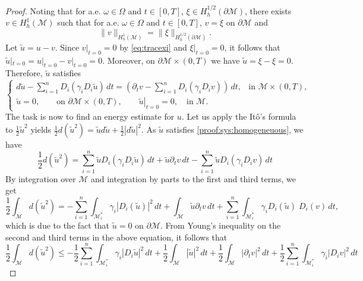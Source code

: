 \documentclass[11pt,oneside,leqno]{amsart}
\numberwithin{equation}{section}
\numberwithin{equation}{section}
\begin{document}
\begin{proof}
Noting that for a.e. $\omega \in \Omega$ and $t \in [0,T]$, $\xi \in H_h^{1/2}(\partial \mathcal{M})$, there exists $v \in H_h^1(\mathcal{M})$ such that for a.e. $\omega \in \Omega$ and $t \in [0,T]$, $v = \xi$ on $\partial \mathcal{M}$ and
\begin{equation}\label{eq:tracexi}
\|v\|_{H_h^1(\mathcal{M})} =  \|\xi\|_{H_h^{1/2}(\partial \mathcal{M})}.
\end{equation}
Let $\tilde{u} = u - v$. Since $v|_{t=0}=0$ by \eqref{eq:tracexi} and $\xi|_{t=0}=0$, it follows that $\tilde{u}|_{t=0} = u|_{t=0} - v|_{t=0} = 0$. Moreover, on $\partial\mathcal{M}\times(0,T)$ we have $\tilde{u} = \xi - \xi = 0$. Therefore, $\tilde{u}$ satisfies
\begin{equation}\label{proof:sys:homogeneuous}
    \begin{cases}
    d\tilde{u} - \sum_{i=1}^{n} D_i(\gamma_i D_i \tilde{u}) \, dt = \left(\partial_t v - \sum_{i=1}^{n} D_i(\gamma_i D_i v)\right) \, dt, & \text{in } \mathcal{M} \times (0,T), \\
    \tilde{u} = 0, \quad\quad\text{on } \partial \mathcal{M} \times (0,T),\quad\quad
    \left.\tilde{u}\right|_{t=0} = 0,\quad \text{in } \mathcal{M}.
    \end{cases}
\end{equation}
The task is now to find an energy estimate for $u$. Let us apply the It\^{o}'s formula to $\displaystyle \frac{1}{2}\tilde{u}^2$ yields $\displaystyle \frac{1}{2}d(\tilde{u}^2)=\tilde{u}d\tilde{u}+\frac{1}{2}|d\tilde{u}|^2$. As $\tilde{u}$ satisfies \eqref{proof:sys:homogeneuous}, we have 
\[
\frac{1}{2}d(\tilde{u}^2)=\sum_{i=1}^{n}\tilde{u}D_i(\gamma_iD_i\tilde{u})\,dt+\tilde{u}\partial_{t}v\,dt-\sum_{i=1}^{n}\tilde{u}D_i(\gamma_iD_iv)\,dt
\]
By integration over $\mathcal{M}$ and integration by parts to the first and third terms, we get
\[
\frac{1}{2}\int_{\mathcal{M}}d(\tilde{u}^{2})=-\sum_{i=1}^{n}\int_{\mathcal{M}_i^{\ast}}\gamma_i|D_i(\tilde{u})|^2\,dt+\int_{\mathcal{M}}\tilde{u}\partial_{t}v\,dt+\sum_{i=1}^{n}\int_{\mathcal{M}_{i}^{*}}\gamma_iD_i(\tilde{u})\;D_i(v)\,dt,
\]
which is due to the fact that $\tilde{u}=0$ on $\partial\mathcal{M}$. From Young's inequality on the second and third terms in the above equation, it follows that
\[
\frac{1}{2}\int_{\mathcal{M}}d(\tilde{u}^2)\leq-\frac{1}{2}\sum_{i=1}^{n}\int_{\mathcal{M}_i^{*}}\gamma_i|D_i\tilde{u}|^2\,dt+\frac{1}{2}\int_{\mathcal{M}}|\tilde{u}|^2\,dt+\frac{1}{2}\int_{\mathcal{M}}|\partial_{t}v|^2\,dt+\frac{1}{2}\sum_{i=1}^{n}\int_{\mathcal{M}_i^{*}}\gamma_i|D_iv|^2\,dt
\]
\end{proof}
\end{document}
